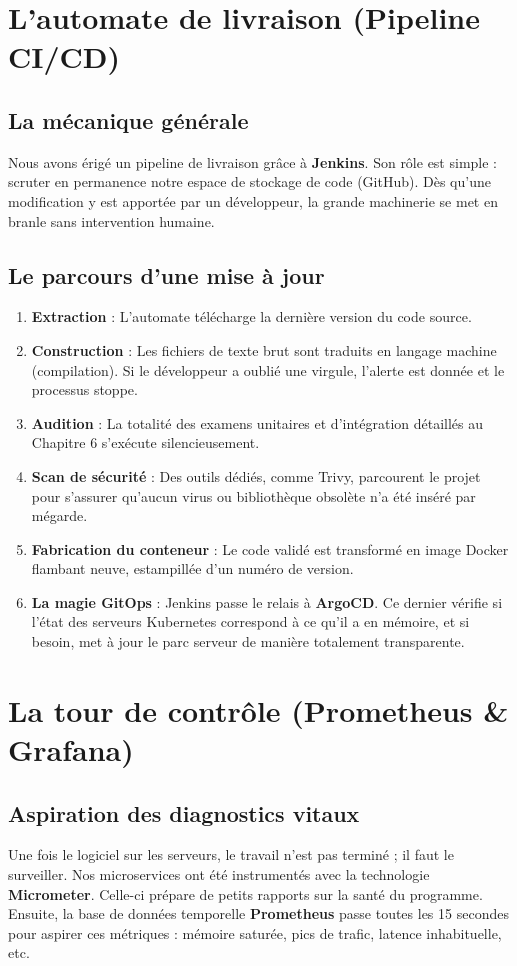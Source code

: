 \documentclass[final]{report}
\begin{document}
\section{L'automate de livraison (Pipeline CI/CD)}
\subsection{La mécanique générale}
Nous avons érigé un pipeline de livraison grâce à \textbf{Jenkins}. Son rôle est simple : scruter en permanence notre espace de stockage de code (GitHub). Dès qu'une modification y est apportée par un développeur, la grande machinerie se met en branle sans intervention humaine.
 
\subsection{Le parcours d'une mise à jour}
\begin{enumerate}
  \item \textbf{Extraction} : L'automate télécharge la dernière version du code source.
  \item \textbf{Construction} : Les fichiers de texte brut sont traduits en langage machine (compilation). Si le développeur a oublié une virgule, l'alerte est donnée et le processus stoppe.
  \item \textbf{Audition} : La totalité des examens unitaires et d'intégration détaillés au Chapitre 6 s'exécute silencieusement.
  \item \textbf{Scan de sécurité} : Des outils dédiés, comme Trivy, parcourent le projet pour s'assurer qu'aucun virus ou bibliothèque obsolète n'a été inséré par mégarde.
  \item \textbf{Fabrication du conteneur} : Le code validé est transformé en image Docker flambant neuve, estampillée d'un numéro de version.
  \item \textbf{La magie GitOps} : Jenkins passe le relais à \textbf{ArgoCD}. Ce dernier vérifie si l'état des serveurs Kubernetes correspond à ce qu'il a en mémoire, et si besoin, met à jour le parc serveur de manière totalement transparente.
\end{enumerate}
 
\section{La tour de contrôle (Prometheus \& Grafana)}
\subsection{Aspiration des diagnostics vitaux}
Une fois le logiciel sur les serveurs, le travail n'est pas terminé ; il faut le surveiller. Nos microservices ont été instrumentés avec la technologie \textbf{Micrometer}. Celle-ci prépare de petits rapports sur la santé du programme. Ensuite, la base de données temporelle \textbf{Prometheus} passe toutes les 15 secondes pour aspirer ces métriques : mémoire saturée, pics de trafic, latence inhabituelle, etc.
 
\end{document}

